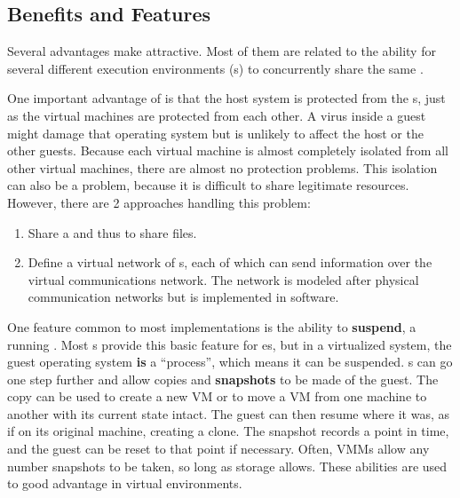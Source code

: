 \subsection{Benefits and Features}\label{subsubsec:VM_Benefits_Features}
Several advantages make  attractive.
Most of them are related to the ability for several different execution environments (s) to concurrently share the same .

One important advantage of  is that the host system is protected from the s, just as the virtual machines are protected from each other.
A virus inside a guest  might damage that operating system but is unlikely to affect the host or the other guests.
Because each virtual machine is almost completely isolated from all other virtual machines, there are almost no protection problems.
This isolation can also be a problem, because it is difficult to share legitimate resources.
However, there are 2 approaches handling this problem:
\begin{enumerate}[noitemsep]
\item Share a   and thus to share files.
\item Define a virtual network of s, each of which can send information over the virtual communications network.
  The network is modeled after physical communication networks but is implemented in software.
\end{enumerate}

One feature common to most  implementations is the ability to \textbf{suspend}, a running .
Most s provide this basic feature for es, but in a virtualized system, the guest operating system \textbf{is} a ``process'', which means it can be suspended.
s can go one step further and allow copies and \textbf{snapshots} to be made of the guest.
The copy can be used to create a new VM or to move a VM from one machine to another with its current state intact.
The guest can then resume where it was, as if on its original machine, creating a clone.
The snapshot records a point in time, and the guest can be reset to that point if necessary.
Often, VMMs allow any number snapshots to be taken, so long as storage allows.
These abilities are used to good advantage in virtual environments.


